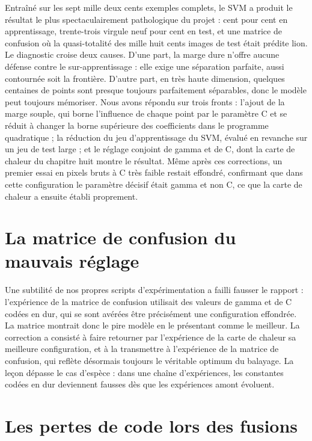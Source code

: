 \documentclass[11pt,a4paper]{report}
\begin{document}
Entraîné sur les sept mille deux cents exemples complets, le SVM a
produit le résultat le plus spectaculairement pathologique du projet :
cent pour cent en apprentissage, trente-trois virgule neuf pour cent en
test, et une matrice de confusion où la quasi-totalité des mille huit
cents images de test était prédite lion. Le diagnostic croise deux
causes. D'une part, la marge dure n'offre aucune défense contre le
sur-apprentissage : elle exige une séparation parfaite, aussi contournée
soit la frontière. D'autre part, en très haute dimension, quelques
centaines de points sont presque toujours parfaitement séparables, donc
le modèle peut toujours mémoriser. Nous avons répondu sur trois fronts :
l'ajout de la marge souple, qui borne l'influence de chaque point par le
paramètre C et se réduit à changer la borne supérieure des coefficients
dans le programme quadratique ; la réduction du jeu d'apprentissage du
SVM, évalué en revanche sur un jeu de test large ; et le réglage
conjoint de gamma et de C, dont la carte de chaleur du chapitre huit
montre le résultat. Même après ces corrections, un premier essai en
pixels bruts à C très faible restait effondré, confirmant que dans cette
configuration le paramètre décisif était gamma et non C, ce que la carte
de chaleur a ensuite établi proprement.

\hypertarget{la-matrice-de-confusion-du-mauvais-ruxe9glage}{%
\section{La matrice de confusion du mauvais
réglage}\label{la-matrice-de-confusion-du-mauvais-ruxe9glage}}

Une subtilité de nos propres scripts d'expérimentation a failli fausser
le rapport : l'expérience de la matrice de confusion utilisait des
valeurs de gamma et de C codées en dur, qui se sont avérées être
précisément une configuration effondrée. La matrice montrait donc le
pire modèle en le présentant comme le meilleur. La correction a consisté
à faire retourner par l'expérience de la carte de chaleur sa meilleure
configuration, et à la transmettre à l'expérience de la matrice de
confusion, qui reflète désormais toujours le véritable optimum du
balayage. La leçon dépasse le cas d'espèce : dans une chaîne
d'expériences, les constantes codées en dur deviennent fausses dès que
les expériences amont évoluent.

\hypertarget{les-pertes-de-code-lors-des-fusions}{%
\section{Les pertes de code lors des
fusions}\label{les-pertes-de-code-lors-des-fusions}}
\end{document}
